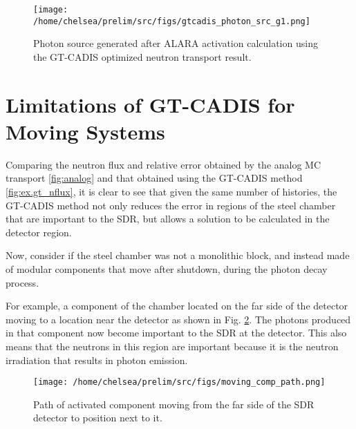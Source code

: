 \begin{figure} 
	\texttt{[image: /home/chelsea/prelim/src/figs/gtcadis\_photon\_src\_g1.png]}
	\caption [GT-CADIS photon source]
	{Photon source generated after ALARA activation calculation using the
	GT-CADIS optimized neutron transport result.\label{fig:ex.gt_psrc}}
\end{figure}




\section{Limitations of GT-CADIS for Moving Systems}

Comparing the neutron flux and relative error obtained by the analog MC 
transport \ref{fig:analog}  and that obtained using the GT-CADIS method
\ref{fig:ex.gt_nflux}, it is clear to see that given the same number of
histories, the GT-CADIS method not only reduces the error in regions of the
steel chamber that are important to the SDR, but allows a solution to be
calculated in the detector region.


Now, consider if the steel
chamber was not a monolithic block, and instead
made of modular components that move after shutdown, during the
photon decay process.

For example,
a component of the chamber located on the far side of the detector moving to a
location near the detector as shown in Fig. \ref{fig:path}.
The photons produced in that component now become
important to the SDR at the detector.  This also means that the neutrons in
this region are important because it is the neutron irradiation that results
in photon emission.

\begin{figure} 
	\texttt{[image: /home/chelsea/prelim/src/figs/moving\_comp\_path.png]}
	\caption[Path of moving component]
	{Path of activated component moving from the far side of the SDR
	detector to position next to it.\label{fig:path}}
\end{figure}

